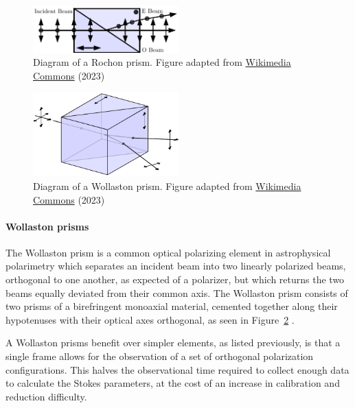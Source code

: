 \begin{figure}[t]
    \centering
    \includegraphics[width=0.5\textwidth]{figures/2_rochon.pdf}
    \caption{Diagram of a Rochon prism. Figure adapted from \protect\href{https://commons.wikimedia.org/wiki/File:Rochon_Prism.svg}{Wikimedia Commons} (2023)}
    \label{fig:Rochon_prism}
\end{figure}

\begin{figure}[t]
    \centering
    \includegraphics[width=0.5\textwidth]{figures/2_wollaston.pdf}
    \caption{Diagram of a Wollaston prism. Figure adapted from \protect\href{https://commons.wikimedia.org/wiki/File:Wollaston-prism.svg}{Wikimedia Commons} (2023)}
    \label{fig:Wollaston_prism}
\end{figure}

\paragraph{Wollaston prisms}
The Wollaston prism is a common optical polarizing element in astrophysical polarimetry which separates an incident beam into two linearly polarized beams, orthogonal to one another, as expected of a polarizer, but which returns the two beams equally deviated from their common axis. The Wollaston prism consists of two prisms of a birefringent monoaxial material, cemented together along their hypotenuses with their optical axes orthogonal, as seen in Figure~\ref{fig:Wollaston_prism} \citep{wollaston}.
\prgph

A Wollaston prisms benefit over simpler elements, as listed previously, is that a single frame allows for the observation of a set of orthogonal polarization configurations. This halves the observational time required to collect enough data to calculate the Stokes parameters, at the cost of an increase in calibration and reduction difficulty.

